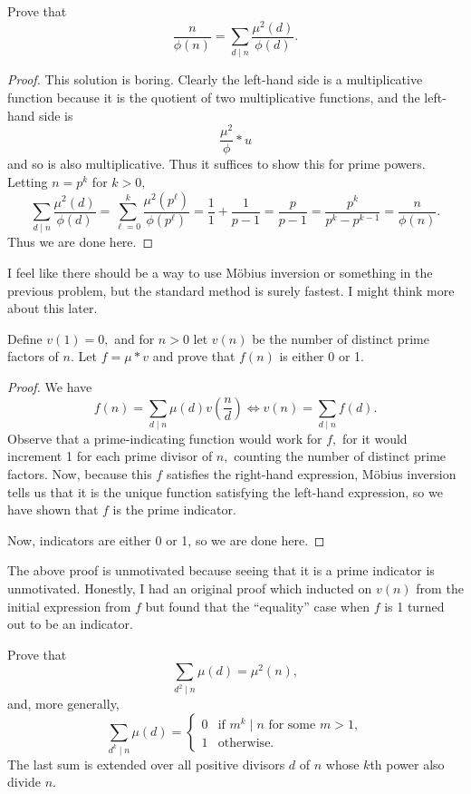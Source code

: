 \begin{exercise}[3]
Prove that
\[\frac n{\phi(n)}=\sum_{d\mid n}\frac{\mu^2(d)}{\phi(d)}.\]
\end{exercise}

\begin{proof}
This solution is boring. Clearly the left-hand side is a multiplicative function because it is the quotient of two multiplicative functions, and the left-hand side is
\[\frac{\mu^2}{\phi}*u\]
and so is also multiplicative. Thus it suffices to show this for prime powers. Letting $n=p^k$ for $k>0,$
\[\sum_{d\mid n}\frac{\mu^2(d)}{\phi(d)}=\sum_{\ell=0}^k\frac{\mu^2\left(p^\ell\right)}{\phi\left(p^\ell\right)}=\frac11+\frac1{p-1}=\frac p{p-1}=\frac{p^k}{p^k-p^{k-1}}=\frac n{\phi(n)}.\]
Thus we are done here.
\end{proof}

I feel like there should be a way to use M\"obius inversion or something in the previous problem, but the standard method is surely fastest. I might think more about this later.

\begin{exercise}[5]
Define $v(1)=0,$ and for $n>0$ let $v(n)$ be the number of distinct prime factors of $n.$ Let $f=\mu*v$ and prove that $f(n)$ is either 0 or 1.
\end{exercise}

\begin{proof}
We have
\[f(n)=\sum_{d\mid n}\mu(d)v\left(\frac nd\right)\iff v(n)=\sum_{d\mid n}f(d).\]
Observe that a prime-indicating function would work for $f,$ for it would increment 1 for each prime divisor of $n,$ counting the number of distinct prime factors. Now, because this $f$ satisfies the right-hand expression, M\"obius inversion tells us that it is the unique function satisfying the left-hand expression, so we have shown that $f$ is the prime indicator.

Now, indicators are either 0 or 1, so we are done here.
\end{proof}

The above proof is unmotivated because seeing that it is a prime indicator is unmotivated. Honestly, I had an original proof which inducted on $v(n)$ from the initial expression from $f$ but found that the ``equality'' case when $f$ is 1 turned out to be an indicator.

\begin{exercise}
Prove that
\[\sum_{d^2\mid n}\mu(d)=\mu^2(n),\]
and, more generally,
\[\sum_{d^k\mid n}\mu(d)=\begin{cases}0 & \text{if }m^k\mid n\text{ for some }m>1, \\ 1 & \text{otherwise.}\end{cases}\]
The last sum is extended over all positive divisors $d$ of $n$ whose $k$th power also divide $n.$
\end{exercise}


